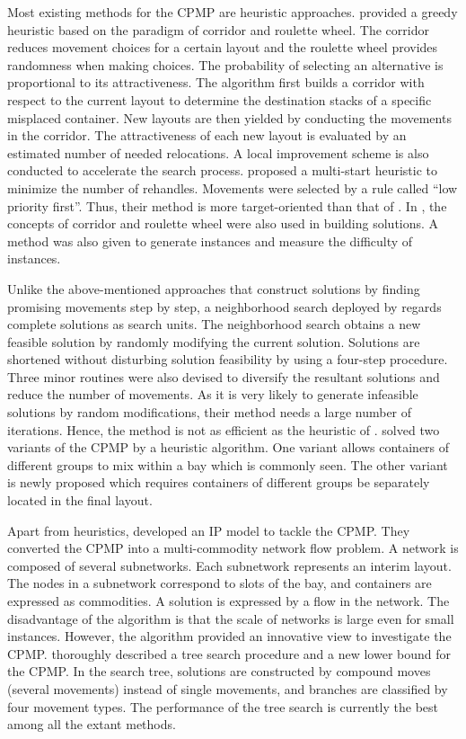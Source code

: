 \documentclass[review,3p,times,authoryear,12pt]{elsarticle}
\begin{document}
Most existing methods for the CPMP are heuristic approaches.
\cite{Caserta2009} provided a greedy heuristic based on the paradigm of corridor and roulette wheel.
The corridor reduces movement choices for a certain layout and the roulette wheel provides randomness when making choices.
The probability of selecting an alternative is proportional to its attractiveness.
The algorithm first builds a corridor with respect to the current layout to determine the destination stacks of a specific misplaced container.
New layouts are then yielded by conducting the movements in the corridor.
The attractiveness of each new layout is evaluated by an estimated number of needed relocations.
A local improvement scheme is also conducted to accelerate the search process.
\cite{Exposito2012} proposed a multi-start heuristic to minimize the number of rehandles.
Movements were selected by a rule called ``low priority first''.
Thus, their method is more target-oriented than that of \cite{Caserta2009}.
In \cite{Exposito2012}, the concepts of corridor and roulette wheel were also used in building solutions.
A method was also given to generate instances and measure the difficulty of instances.

Unlike the above-mentioned approaches that construct solutions by finding promising movements step by step, a neighborhood search deployed by \cite{Lee2009} regards complete solutions as search units.
The neighborhood search obtains a new feasible solution by randomly modifying the current solution.
Solutions are shortened without disturbing solution feasibility by using a four-step procedure.
Three minor routines were also devised to diversify the resultant solutions and reduce the number of movements.
As it is very likely to generate infeasible solutions by random modifications, their method needs a large number of iterations.
Hence, the method is not as efficient as the heuristic of \cite{Exposito2012}.
\cite{Huang2012heu} solved two variants of the CPMP by a heuristic algorithm.
One variant allows containers of different groups to mix within a bay which is commonly seen.
The other variant is newly proposed which requires containers of different groups be separately located in the final layout.

Apart from heuristics, \cite{Lee2007} developed an IP model to tackle the CPMP.
They converted the CPMP into a multi-commodity network flow problem.
A network is composed of several subnetworks.
Each subnetwork represents an interim layout.
The nodes in a subnetwork correspond to slots of the bay, and containers are expressed as commodities.
A solution is expressed by a flow in the network.
The disadvantage of the algorithm is that the scale of networks is large even for small instances.
However, the algorithm provided an innovative view to investigate the CPMP.
\cite{BF2012} thoroughly described a tree search procedure and a new lower bound for the CPMP.
In the search tree, solutions are constructed by compound moves (several movements) instead of single movements, and branches are classified by four movement types.
The performance of the tree search is currently the best among all the extant methods.
\end{document}
